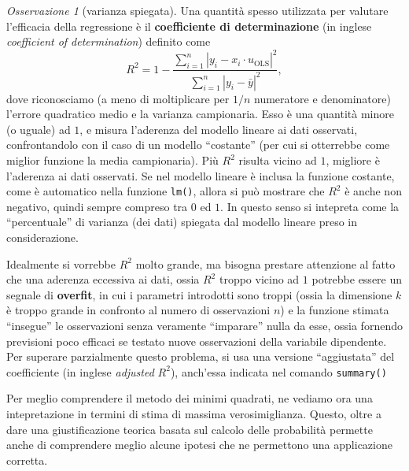 \documentclass[
  italian,
  letterpaper,
]{book}
\newcommand{\ols}{\operatorname{OLS}}
\theoremstyle{definition}
\theoremstyle{remark}
\newtheorem*{remark}{Osservazione}
\begin{document}
\begin{remark}[varianza spiegata]
Una quantità spesso utilizzata per valutare l'efficacia della
regressione è il \textbf{coefficiente di determinazione} (in inglese
\emph{coefficient of determination}) definito come
\[ R^2 =  1- \frac{ \sum_{i=1}^n |y_i -x_i \cdot u_{\ols}|^2}{ \sum_{i=1}^n |y_i - \bar{y}|^2},\]
dove riconosciamo (a meno di moltiplicare per \(1/n\) numeratore e
denominatore) l'errore quadratico medio e la varianza campionaria. Esso
è una quantità minore (o uguale) ad \(1\), e misura l'aderenza del
modello lineare ai dati osservati, confrontandolo con il caso di un
modello ``costante'' (per cui si otterrebbe come miglior funzione la
media campionaria). Più \(R^2\) risulta vicino ad \(1\), migliore è
l'aderenza ai dati osservati. Se nel modello lineare è inclusa la
funzione costante, come è automatico nella funzione \texttt{lm()},
allora si può mostrare che \(R^2\) è anche non negativo, quindi sempre
compreso tra \(0\) ed \(1\). In questo senso si intepreta come la
``percentuale'' di varianza (dei dati) spiegata dal modello lineare
preso in considerazione.

Idealmente si vorrebbe \(R^2\) molto grande, ma bisogna prestare
attenzione al fatto che una aderenza eccessiva ai dati, ossia \(R^2\)
troppo vicino ad \(1\) potrebbe essere un segnale di \textbf{overfit},
in cui i parametri introdotti sono troppi (ossia la dimensione \(k\) è
troppo grande in confronto al numero di osservazioni \(n\)) e la
funzione stimata ``insegue'' le osservazioni senza veramente
``imparare'' nulla da esse, ossia fornendo previsioni poco efficaci se
testato nuove osservazioni della variabile dipendente. Per superare
parzialmente questo problema, si usa una versione ``aggiustata'' del
coefficiente (in inglese \emph{adjusted} \(R^2\)), anch'essa indicata
nel comando \texttt{summary()}
\end{remark}

Per meglio comprendere il metodo dei minimi quadrati, ne vediamo ora una
intepretazione in termini di stima di massima verosimiglianza. Questo,
oltre a dare una giustificazione teorica basata sul calcolo delle
probabilità permette anche di comprendere meglio alcune ipotesi che ne
permettono una applicazione corretta.
\end{document}
